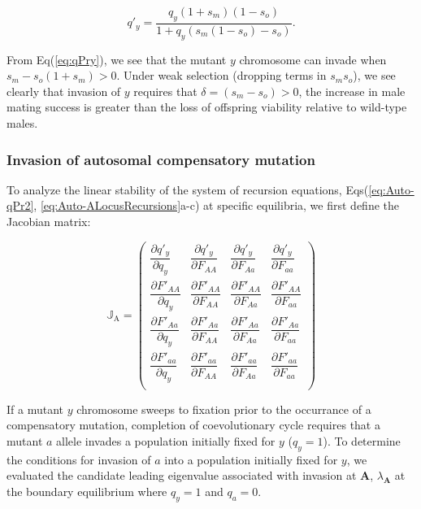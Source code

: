 \documentclass{article}
\begin{document}
\begin{equation} \label{eq:qPry}
	q'_{y} = \frac{q_y (1 + s_m)(1 - s_o)}{1 + q_y (s_m (1 - s_o) - s_o)}.
\end{equation}

\noindent From Eq(\ref{eq:qPry}), we see that the mutant $y$ chromosome can invade when $s_m - s_o(1 + s_m) > 0$. Under weak selection (dropping terms in $s_m s_o$), we see clearly that invasion of $y$ requires that $\delta = (s_m - s_o) > 0$, the increase in male mating success is greater than the loss of offspring viability relative to wild-type males.


\subsubsection{Invasion of autosomal compensatory mutation}

To analyze the linear stability of the system of recursion equations, Eqs(\ref{eq:Auto-qPr2}, \ref{eq:Auto-ALocusRecursions}a-c) at specific equilibria, we first define the Jacobian matrix:

\begin{equation}
	\mathbb{J}_{\text{A}} = \left( \begin{array}{cccc} 
		\dfrac{\partial  q'_y}{\partial q_y} & \dfrac{\partial  q'_y}{\partial F_{AA}} & \dfrac{\partial  q'_y}{\partial F_{Aa}} & \dfrac{\partial  q'_y}{\partial F_{aa}} \\ 
		\dfrac{\partial  F'_{AA}}{\partial q_y} & \dfrac{\partial  F'_{AA}}{\partial F_{AA}} & \dfrac{\partial  F'_{AA}}{\partial F_{Aa}} & \dfrac{\partial  F'_{AA}}{\partial F_{aa}} \\ 
		\dfrac{\partial  F'_{Aa}}{\partial q_y} & \dfrac{\partial  F'_{Aa}}{\partial F_{AA}} & \dfrac{\partial  F'_{Aa}}{\partial F_{Aa}} & \dfrac{\partial  F'_{Aa}}{\partial F_{aa}} \\ 
		\dfrac{\partial  F'_{aa}}{\partial q_y} & \dfrac{\partial  F'_{aa}}{\partial F_{AA}} & \dfrac{\partial  F'_{aa}}{\partial F_{Aa}} & \dfrac{\partial  F'_{aa}}{\partial F_{aa}} \\ 
	\end{array} \right)
\end{equation}

\noindent If a mutant $y$ chromosome sweeps to fixation prior to the occurrance of a compensatory mutation, completion of coevolutionary cycle requires that a mutant $a$ allele invades a population initially fixed for $y$ ($q_y = 1$). To determine the conditions for invasion of $a$ into a population initially fixed for $y$, we evaluated the candidate leading eigenvalue associated with invasion at $\mathbf{A}$, $\lambda_{\mathbf{A}}$ at the boundary equilibrium where $q_y = 1$ and $q_a = 0$.
\end{document}

